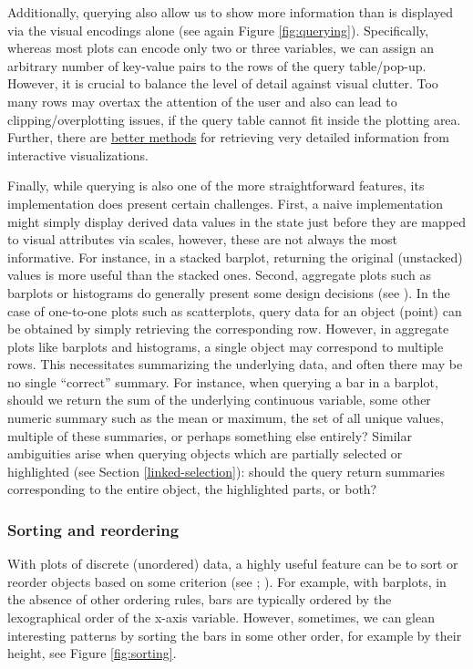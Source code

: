 \documentclass[
]{book}
\theoremstyle{definition}
\theoremstyle{definition}
\theoremstyle{definition}
\theoremstyle{definition}
\theoremstyle{remark}
\begin{document}
Additionally, querying also allow us to show more information than is displayed via the visual encodings alone (see again Figure \ref{fig:querying}). Specifically, whereas most plots can encode only two or three variables, we can assign an arbitrary number of key-value pairs to the rows of the query table/pop-up. However, it is crucial to balance the level of detail against visual clutter. Too many rows may overtax the attention of the user and also can lead to clipping/overplotting issues, if the query table cannot fit inside the plotting area. Further, there are \hyperref[bidirectional-communication]{better methods} for retrieving very detailed information from interactive visualizations.

Finally, while querying is also one of the more straightforward features, its implementation does present certain challenges. First, a naive implementation might simply display derived data values in the state just before they are mapped to visual attributes via scales, however, these are not always the most informative. For instance, in a stacked barplot, returning the original (unstacked) values is more useful than the stacked ones. Second, aggregate plots such as barplots or histograms do generally present some design decisions (see ). In the case of one-to-one plots such as scatterplots, query data for an object (point) can be obtained by simply retrieving the corresponding row. However, in aggregate plots like barplots and histograms, a single object may correspond to multiple rows. This necessitates summarizing the underlying data, and often there may be no single ``correct'' summary. For instance, when querying a bar in a barplot, should we return the sum of the underlying continuous variable, some other numeric summary such as the mean or maximum, the set of all unique values, multiple of these summaries, or perhaps something else entirely? Similar ambiguities arise when querying objects which are partially selected or highlighted (see Section \ref{linked-selection}): should the query return summaries corresponding to the entire object, the highlighted parts, or both?

\subsubsection{Sorting and reordering}\label{sorting-and-reordering}

With plots of discrete (unordered) data, a highly useful feature can be to sort or reorder objects based on some criterion (see ; ). For example, with barplots, in the absence of other ordering rules, bars are typically ordered by the lexographical order of the x-axis variable. However, sometimes, we can glean interesting patterns by sorting the bars in some other order, for example by their height, see Figure \ref{fig:sorting}.
\end{document}

